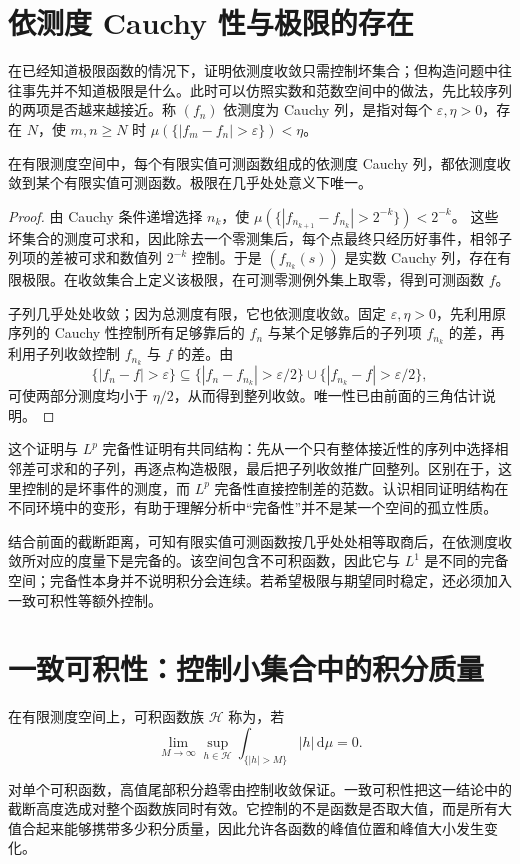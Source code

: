\documentclass[UTF8,12pt,a4paper,fontset=fandol]{ctexbook}
\begin{document}
\section{依测度 Cauchy 性与极限的存在}
在已经知道极限函数的情况下，证明依测度收敛只需控制坏集合；但构造问题中往往事先并不知道极限是什么。此时可以仿照实数和范数空间中的做法，先比较序列的两项是否越来越接近。称 $(f_n)$ 依测度为 Cauchy 列，是指对每个 $\varepsilon,\eta>0$，存在 $N$，使 $m,n\geq N$ 时
$\mu(\{|f_m-f_n|>\varepsilon\})<\eta$。

\begin{proposition}
在有限测度空间中，每个有限实值可测函数组成的依测度 Cauchy 列，都依测度收敛到某个有限实值可测函数。极限在几乎处处意义下唯一。
\end{proposition}
\begin{proof}
由 Cauchy 条件递增选择 $n_k$，使
$\mu(\{|f_{n_{k+1}}-f_{n_k}|>2^{-k}\})<2^{-k}$。
这些坏集合的测度可求和，因此除去一个零测集后，每个点最终只经历好事件，相邻子列项的差被可求和数值列 $2^{-k}$ 控制。于是 $(f_{n_k}(s))$ 是实数 Cauchy 列，存在有限极限。在收敛集合上定义该极限，在可测零测例外集上取零，得到可测函数 $f$。

子列几乎处处收敛；因为总测度有限，它也依测度收敛。固定 $\varepsilon,\eta>0$，先利用原序列的 Cauchy 性控制所有足够靠后的 $f_n$ 与某个足够靠后的子列项 $f_{n_k}$ 的差，再利用子列收敛控制 $f_{n_k}$ 与 $f$ 的差。由
\[
 \{|f_n-f|>\varepsilon\}\subseteq
 \{|f_n-f_{n_k}|>\varepsilon/2\}
 \cup\{|f_{n_k}-f|>\varepsilon/2\},
\]
可使两部分测度均小于 $\eta/2$，从而得到整列收敛。唯一性已由前面的三角估计说明。
\end{proof}
这个证明与 $L^p$ 完备性证明有共同结构：先从一个只有整体接近性的序列中选择相邻差可求和的子列，再逐点构造极限，最后把子列收敛推广回整列。区别在于，这里控制的是坏事件的测度，而 $L^p$ 完备性直接控制差的范数。认识相同证明结构在不同环境中的变形，有助于理解分析中“完备性”并不是某一个空间的孤立性质。

结合前面的截断距离，可知有限实值可测函数按几乎处处相等取商后，在依测度收敛所对应的度量下是完备的。该空间包含不可积函数，因此它与 $L^1$ 是不同的完备空间；完备性本身并不说明积分会连续。若希望极限与期望同时稳定，还必须加入一致可积性等额外控制。

\section{一致可积性：控制小集合中的积分质量}
\begin{definition}
在有限测度空间上，可积函数族 $\mathcal H$ 称为，若
\[
 \lim_{M\to\infty}\sup_{h\in\mathcal H}
 \int_{\{|h|>M\}}|h|\,\mathrm d\mu=0.
\]
\label{def:mt-uniform-integrability}
\end{definition}
对单个可积函数，高值尾部积分趋零由控制收敛保证。一致可积性把这一结论中的截断高度选成对整个函数族同时有效。它控制的不是函数是否取大值，而是所有大值合起来能够携带多少积分质量，因此允许各函数的峰值位置和峰值大小发生变化。
\end{document}

